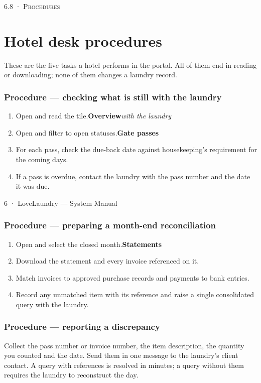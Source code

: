 \documentclass[11pt,a4paper,oneside]{book}
\begin{document}
\textsc{\small\color{crimson}6.8 · Procedures}\par\medskip
\section*{Hotel desk procedures}
These are the five tasks a hotel performs in the portal. All of them end in reading or downloading; none of them changes a laundry record.

\subsubsection*{Procedure — checking what is still with the laundry}
\begin{enumerate}
\item Open  and read the  tile.\textbf{Overview}\emph{with the laundry}
\item Open  and filter to open statuses.\textbf{Gate passes}
\item For each pass, check the due-back date against housekeeping's requirement for the coming days.
\item If a pass is overdue, contact the laundry with the pass number and the date it was due.
\end{enumerate}
6 · LoveLaundry — System Manual

\subsubsection*{Procedure — preparing a month-end reconciliation}
\begin{enumerate}
\item Open  and select the closed month.\textbf{Statements}
\item Download the statement and every invoice referenced on it.
\item Match invoices to approved purchase records and payments to bank entries.
\item Record any unmatched item with its reference and raise a single consolidated query with the laundry.
\end{enumerate}
\subsubsection*{Procedure — reporting a discrepancy}
Collect the pass number or invoice number, the item description, the quantity you counted and the date. Send them in one message to the laundry's client contact. A query with references is resolved in minutes; a query without them requires the laundry to reconstruct the day.
\end{document}
